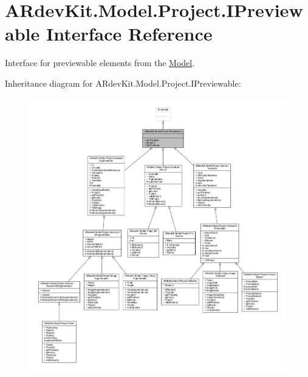 \hypertarget{interface_a_rdev_kit_1_1_model_1_1_project_1_1_i_previewable}{\section{A\-Rdev\-Kit.\-Model.\-Project.\-I\-Previewable Interface Reference}
\label{interface_a_rdev_kit_1_1_model_1_1_project_1_1_i_previewable}
}


Interface for previewable elements from the \hyperlink{namespace_a_rdev_kit_1_1_model}{Model}.  




Inheritance diagram for A\-Rdev\-Kit.\-Model.\-Project.\-I\-Previewable\-:
\nopagebreak
\begin{figure}[H]
\begin{center}
\leavevmode
\includegraphics[width=350pt]{interface_a_rdev_kit_1_1_model_1_1_project_1_1_i_previewable__inherit__graph}
\end{center}
\end{figure}


